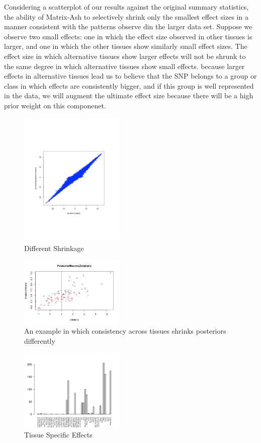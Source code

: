 \documentclass[10pt,letterpaper]{article}
\begin{document}
Considering a scatterplot of our results against the original summary statistics, the ability of Matrix-Ash to selectively shrink only the smallest effect sizes in a manner consistent with the patterns observe din the larger data set. Suppose we observe two small effects: one in which the effect size observed in other tissues is larger, and one in which the other tissues show similarly small effect sizes. The effect size in which alternative tissues show larger effects will not be shrunk to the same degree in which alternative tissues show small effects. because larger effects in alternative tissues lead us to believe that the  SNP belongs to a group or class in which effects are consistently bigger, and if this group is well represented in the data, we will augment the ultimate effect size because there will be a high prior weight on this componenet.
 \begin{figure}[h]
\includegraphics[width=5cm]{scatterplot}
\caption{Different Shrinkage}
\end{figure}

 \begin{figure}[h]
\includegraphics[width=5cm]{selective_shirnk.png}
\caption{An example in which consistency across tissues shrinks posteriors differently}
\end{figure}



 \begin{figure}
\includegraphics[width=5cm]{TissueSpecific}
\caption{Tissue Specific Effects}
\end{figure}
\end{document}
